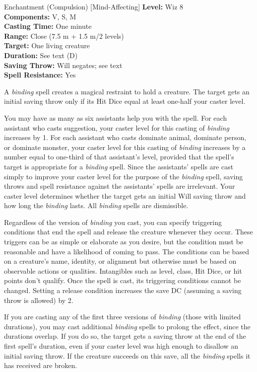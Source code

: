{Enchantment (Compulsion) [Mind-Affecting]}
{
	\textbf{Level:}
	Wiz 8\\
	\textbf{Components:}
	V, S, M\\
	\textbf{Casting Time:}
	One minute\\
	\textbf{Range:}
	Close (7.5 m + 1.5 m/2 levels)\\
	\textbf{Target:}
	One living creature\\
	\textbf{Duration:}
	See text (D)\\
	\textbf{Saving Throw:}
	Will negates; see text\\
	\textbf{Spell Resistance:}
	Yes\\
}
{
	A \emph{binding} spell creates a magical restraint to hold a creature. The target gets an initial saving throw only if its Hit Dice equal at least one-half your caster level.

	You may have as many as six assistants help you with the spell. For each assistant who casts suggestion, your caster level for this casting of \emph{binding} increases by 1. For each assistant who casts dominate animal, dominate person, or dominate monster, your caster level for this casting of \emph{binding} increases by a number equal to one-third of that assistant's level, provided that the spell's target is appropriate for a \emph{binding} spell. Since the assistants' spells are cast simply to improve your caster level for the purpose of the \emph{binding} spell, saving throws and spell resistance against the assistants' spells are irrelevant. Your caster level determines whether the target gets an initial Will saving throw and how long the \emph{binding} lasts. All \emph{binding} spells are dismissible.

	Regardless of the version of \emph{binding} you cast, you can specify triggering conditions that end the spell and release the creature whenever they occur. These triggers can be as simple or elaborate as you desire, but the condition must be reasonable and have a likelihood of coming to pass. The conditions can be based on a creature's name, identity, or alignment but otherwise must be based on observable actions or qualities. Intangibles such as level, class, Hit Dice, or hit points don't qualify. Once the spell is cast, its triggering conditions cannot be changed. Setting a release condition increases the save DC (assuming a saving throw is allowed) by 2.

	If you are casting any of the first three versions of \emph{binding} (those with limited durations), you may cast additional \emph{binding} spells to prolong the effect, since the durations overlap. If you do so, the target gets a saving throw at the end of the first spell's duration, even if your caster level was high enough to disallow an initial saving throw. If the creature succeeds on this save, all the \emph{binding} spells it has received are broken.

}
